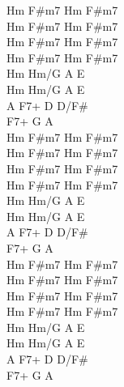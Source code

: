 \begin{chord}
Hm F#m7 Hm F#m7\\
Hm F#m7 Hm F#m7\\
Hm F#m7 Hm F#m7\\
Hm F#m7 Hm F#m7\\

Hm Hm/G A E\\
Hm Hm/G A E\\
A F7+ D D/F#\\
F7+ G A\\

Hm F#m7 Hm F#m7\\
Hm F#m7 Hm F#m7\\
Hm F#m7 Hm F#m7\\
Hm F#m7 Hm F#m7\\

Hm Hm/G A E\\
Hm Hm/G A E\\
A F7+ D D/F#\\
F7+ G A\\

Hm F#m7 Hm F#m7\\
Hm F#m7 Hm F#m7\\
Hm F#m7 Hm F#m7\\
Hm F#m7 Hm F#m7\\

Hm Hm/G A E\\
Hm Hm/G A E\\
A F7+ D D/F#\\
F7+ G A\\
\end{chord}
